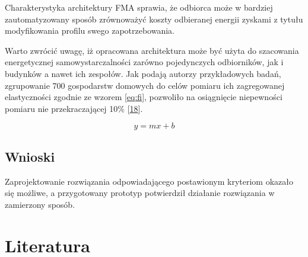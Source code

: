 Charakterystyka architektury FMA sprawia, że odbiorca może w bardziej
zautomatyzowany sposób zrównoważyć koszty odbieranej energii zyskami z
tytułu modyfikowania profilu swego zapotrzebowania.

Warto zwrócić uwagę, iż opracowana architektura może być użyta do
szacowania energetycznej samowystarczalności zarówno pojedynczych
odbiorników, jak i budynków a nawet ich zespołów. Jak podają autorzy
przykładowych badań, zgrupowanie 700 gospodarstw domowych do celów
pomiaru ich zagregowanej elastyczności zgodnie ze wzorem \eqref{eq:fi},
pozwoliło na osiągnięcie niepewności pomiaru nie przekraczającej 10\%
{[}\protect\hyperlink{ref-wang_development_2018}{18}{]}.

\begin{equation} y = mx + b \label{eq:fi}\end{equation}

\hypertarget{wnioski}{%
\section{Wnioski}\label{wnioski}}

Zaprojektowanie rozwiązania odpowiadającego postawionym kryteriom
okazało się możliwe, a przygotowany prototyp potwierdził działanie
rozwiązania w zamierzony sposób.

\hypertarget{literatura}{%
\chapter*{Literatura}\label{literatura}}

\setlength{\parindent}{0em}

